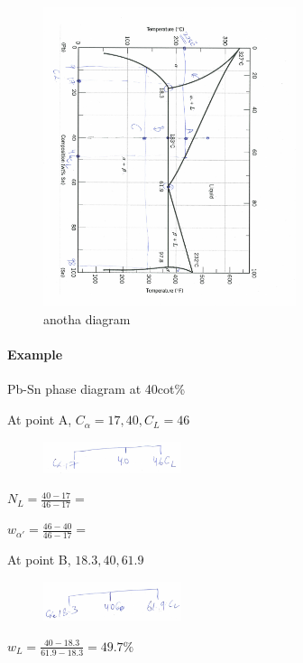 \documentclass{article}
\begin{document}
\begin{figure}[H]
    \centering
	\includegraphics[width=0.66\textwidth]{assets/8edf2f27.png}
    \caption{anotha diagram}
    \label{fig:my_label}
\end{figure}

\paragraph{Example} Pb-Sn phase diagram at 40cot\%



At point A, $C_\alpha = 17, 40, C_L = 46$
\begin{figure}[h!]
	\centering
	\includegraphics[width=0.36\textwidth]{assets/501239bf.png}
\end{figure}

$N_L = \frac{40-17}{46-17}=$

$w_{\alpha'} = \frac{46-40}{46-17} = $

At point B, $18.3, 40, 61.9$
\begin{figure}[H]
	\centering
	\includegraphics[width=0.36\textwidth]{assets/65a27bc0.png}
\end{figure}

$w_L = \frac{40-18.3}{61.9-18.3} = 49.7\%$
\end{document}
